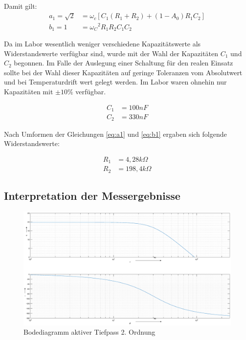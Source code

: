 Damit gilt: 
\begin{align}
    a_1 = \sqrt{2} &= \omega_c[C_1(R_1+R_2) + (1-A_0)R_1C_2] \label{eq:a1}\\
    b_1 = 1 &= {\omega_C}^2R_1R_2C_1C_2 \label{eq:b1}
\end{align}

Da im Labor wesentlich weniger verschiedene Kapazitätswerte als Widerstandswerte verfügbar sind, wurde mit der Wahl der Kapazitäten $C_1$ und $C_2$ begonnen. Im Falle der Auslegung einer Schaltung für den realen Einsatz sollte bei der Wahl dieser Kapazitäten auf geringe Toleranzen vom Absolutwert und bei Temperaturdrift wert gelegt werden. Im Labor waren ohnehin nur Kapazitäten mit $\pm10\%$ verfügbar. 

\begin{align}
    C_1 &= 100nF \\
    C_2 &= 330nF
\end{align}

Nach Umformen der Gleichungen \ref{eq:a1} und \ref{eq:b1} ergaben sich folgende Widerstandswerte:

\begin{align}
    R_1 &= 4,28k\Omega \\
    R_2 &= 198,4 k\Omega
\end{align}



\subsection{Interpretation der Messergebnisse}
\begin{figure}[h]
    \centering
    \includegraphics[width = \costumPicWidth]{Lab_3/Plots/sallen_key.eps}
    \caption{Bodediagramm aktiver Tiefpass 2. Ordnung}
    \label{fig:my_label}
\end{figure}